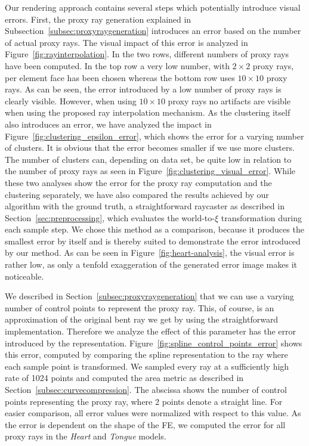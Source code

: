 \documentclass[journal]{vgtc}                %
\begin{document}
Our rendering approach contains several steps which potentially introduce visual errors. First, the proxy ray generation explained in Subsection~\ref{subsec:proxyraygeneration} introduces an error based on the number of actual proxy rays. The visual impact of this error is analyzed in Figure~\ref{fig:rayinterpolation}. In the two rows, different numbers of proxy rays have been computed. In the top row a very low number, with $2 \times 2$ proxy rays, per element face has been chosen whereas the bottom row uses $10 \times 10$ proxy rays. As can be seen, the error introduced by a low number of proxy rays is clearly visible. However, when using $10 \times 10$ proxy rays no artifacts are visible when using the proposed ray interpolation mechanism. As the clustering itself also introduces an error, we have analyzed the impact in Figure~\ref{fig:clustering_epsilon_error}, which shows the error for a varying number of clusters. It is obvious that the error becomes smaller if we use more clusters. The number of clusters can, depending on data set, be quite low in relation to the number of proxy rays as seen in Figure~\ref{fig:clustering_visual_error}. While these two analyses show the error for the proxy ray computation and the clustering separately, we have also compared the results achieved by our algorithm with the ground truth, a straightforward raycaster as described in Section~\ref{sec:preprocessing}, which evaluates the world-to-$\xi$ transformation during each sample step. We chose this method as a comparison, because it produces the smallest error by itself and is thereby suited to demonstrate the error introduced by our method. As can be seen in Figure~\ref{fig:heart-analysis}, the visual error is rather low, as only a tenfold exaggeration of the generated error image makes it noticeable.

We described in Section~\ref{subsec:proxyraygeneration} that we can use a varying number of control points to represent the proxy ray. This, of course, is an approximation of the original bent ray we get by using the straightforward implementation. Therefore we analyze the effect of this parameter has the error introduced by the representation. Figure~\ref{fig:spline_control_points_error} shows this error, computed by comparing the spline representation to the ray where each sample point is transformed. We sampled every ray at a sufficiently high rate of 1024 points and computed the area metric as described in Section~\ref{subsec:curvecompression}. The abscissa shows the number of control points representing the proxy ray, where 2 points denote a straight line. For easier comparison, all error values were normalized with respect to this value. As the error is dependent on the shape of the FE, we computed the error for all proxy rays in the \emph{Heart} and \emph{Tongue} models.
\end{document}
